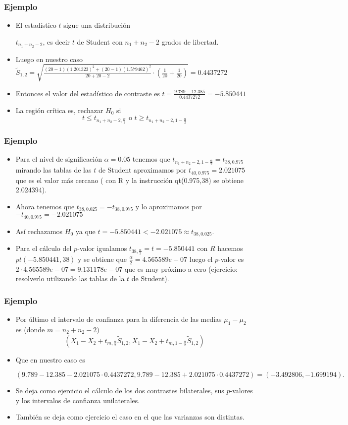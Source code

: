 \begin{frame}
\frametitle{Ejemplo}
\begin{itemize}
\item El estadístico $t$ sigue una distribución

$t_{n_1 +n_2
-2}$, es decir $t$ de Student con $n_1 +n_2 -2$ grados de libertad.
\item Luego en nuestro caso $\tilde{S}_{1,2}=\sqrt{\frac{(20
-1)( 1.201323)^2 +(20 -1)(1.579462)^2}{20 + 20 
-2}\cdot\left(\frac{1}{20}+\frac{1}{20}\right)}= 0.4437272$
\item Entonces el valor del estadístico de contraste es $t= \frac{9.789-12.385}{0.4437272}=-5.850441$
\item La región crítica es, rechazar $H_0$ si 
$$t\leq t_{n_1+n_2-2,\frac{\alpha}{2}}\mbox{ o } t \geq
t_{n_1+n_2-2,1-\frac{\alpha}{2}}$$
\end{itemize}
\end{frame}

\begin{frame}
\frametitle{Ejemplo}
\begin{itemize}
\item Para el nivel de significación $\alpha=0.05$ tenemos que $t_{n_1+n_2-2,1-\frac{\alpha}{2}}=t_{38,0.975}$ mirando las tablas de las $t$ de Student aproximamos por $t_{40,0.975}= 2.021075$ que es el valor más cercano ( con R y la instrucción qt(0.975,38) se obtiene  $2.024394$).
\item Ahora tenemos que $t_{38,0.025}=-t_{38,0.975}$ y lo aproximamos por $-t_{40,0.975}= -2.021075$
\item Así rechazamos $H_0$ ya que $t=-5.850441< -2.021075\approx t_{38,0.025}$.
\item Para el cálculo del $p$-valor   igualamos $t_{38,\frac{\alpha}{2}}=t=-5.850441$  con $R$ hacemos 
$pt(-5.850441,38)$ y se obtiene que  $\frac{\alpha}{2}=4.565589e-07$ luego el $p$-valor es $2\cdot 4.565589e-07=
9.131178e-07$ que es muy próximo a cero (ejercicio: resolverlo utilizando las tablas de la $t$ de Student).
\end{itemize}
\end{frame}

\begin{frame}
\frametitle{Ejemplo}
\begin{itemize}
\item Por último el intervalo de confianza para la diferencia de las medias $\mu_1-\mu_2$ es (donde $m=n_2+n_2-2$)
$$(\overline{X}_1 -\overline{X}_2
+t_{m,\frac{\alpha}{2}} \tilde{S}_{1,2},\overline{X}_1 -\overline{X}_2
+t_{m,1-\frac{\alpha}{2}}
\tilde{S}_{1,2})$$
\item Que en nuestro caso es 

$(9.789-12.385-2.021075\cdot  0.4437272,9.789-12.385+2.021075\cdot 
0.4437272)= ( -3.492806, -1.699194).$
\item  Se deja como ejercicio el cálculo de los dos contrastes bilaterales, sus $p$-valores y los intervalos de confianza unilaterales.
\item También se deja como ejercicio el caso en el que las varianzas son distintas.
\end{itemize}
\end{frame}

